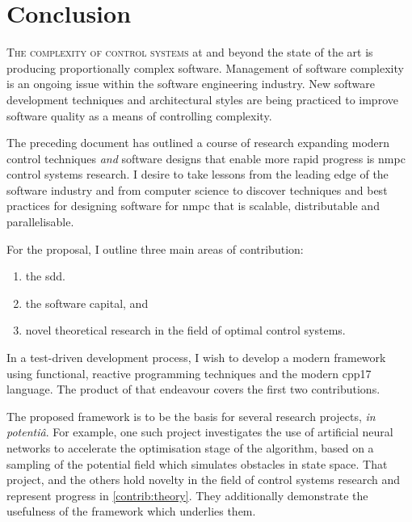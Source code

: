 %
\chapter{Conclusion}%
\label{chap:conclusion}

\textsc{The complexity of control systems} at and beyond the state of the art is
producing proportionally complex software. Management of software complexity is
an ongoing issue within the software engineering industry. New software
development techniques and architectural styles are being practiced to improve
software quality as a means of controlling complexity.

The preceding document has outlined a course of research expanding modern
control techniques \emph{and} software designs that enable more rapid progress
is \ac{nmpc} control systems research. I desire to take lessons from the leading
edge of the software industry and from computer science to discover techniques
and best practices for designing software for \ac{nmpc} that is scalable,
distributable and parallelisable.

For the proposal, I outline three main areas of contribution:
\begin{enumerate}[label=(C\arabic*)]
  \item the \acl{sdd}.
  \item the software capital, and
  \item novel theoretical research in the field of optimal control
  systems.
\end{enumerate}

In a test-driven development process, I wish to develop a modern framework using
functional, reactive programming techniques and the modern \ac{cpp17} language.
The product of that endeavour covers the first two contributions.

The proposed framework is to be the basis for several research projects,
\textit{in potentiâ}. For example, one such project investigates the use of
artificial neural networks to accelerate the optimisation stage of the
algorithm, based on a sampling of the potential field which simulates obstacles
in state space. That project, and the others hold novelty in the field of
control systems research and represent progress in \ref{contrib:theory}. They
additionally demonstrate the usefulness of the framework which underlies them.
